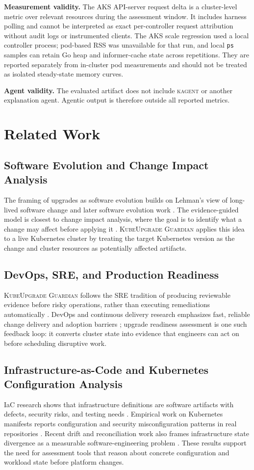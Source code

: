\documentclass[10pt,journal]{IEEEtran}
\newcommand{\tool}{\textsc{KubeUpgrade Guardian}}
\newcommand{\code}[1]{\texttt{#1}}
\newcommand{\kagent}{\textsc{kagent}}
\begin{document}
\textbf{Measurement validity.} The AKS API-server request delta is a cluster-level metric over relevant resources during the assessment window. It includes harness polling and cannot be interpreted as exact per-controller request attribution without audit logs or instrumented clients. The AKS scale regression used a local controller process; pod-based RSS was unavailable for that run, and local \code{ps} samples can retain Go heap and informer-cache state across repetitions. They are reported separately from in-cluster pod measurements and should not be treated as isolated steady-state memory curves.

\textbf{Agent validity.} The evaluated artifact does not include \kagent{} or another explanation agent. Agentic output is therefore outside all reported metrics.

\section{Related Work}
\label{sec:related}
\subsection{Software Evolution and Change Impact Analysis}
The framing of upgrades as software evolution builds on Lehman's view of long-lived software change and later software evolution work \cite{lehman1980,mens2008}. The evidence-guided model is closest to change impact analysis, where the goal is to identify what a change may affect before applying it \cite{bohner1996}. \tool{} applies this idea to a live Kubernetes cluster by treating the target Kubernetes version as the change and cluster resources as potentially affected artifacts.

\subsection{DevOps, SRE, and Production Readiness}
\tool{} follows the SRE tradition of producing reviewable evidence before risky operations, rather than executing remediations automatically \cite{beyer2016,nygard2018}. DevOps and continuous delivery research emphasizes fast, reliable change delivery and adoption barriers \cite{humbleFarley2010,forsgren2018}; upgrade readiness assessment is one such feedback loop: it converts cluster state into evidence that engineers can act on before scheduling disruptive work.

\subsection{Infrastructure-as-Code and Kubernetes Configuration Analysis}
IaC research shows that infrastructure definitions are software artifacts with defects, security risks, and testing needs \cite{rahman2019iac}. Empirical work on Kubernetes manifests reports configuration and security misconfiguration patterns in real repositories \cite{rahman2023k8s,zhang2025k8s}. Recent drift and reconciliation work also frames infrastructure state divergence as a measurable software-engineering problem \cite{iacDriftAgents2025}. These results support the need for assessment tools that reason about concrete configuration and workload state before platform changes.
\end{document}
